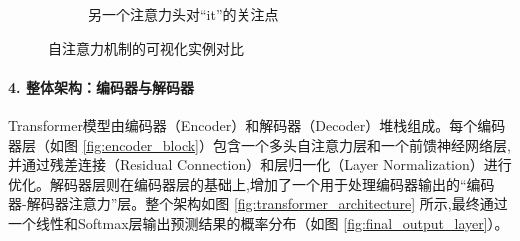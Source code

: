 \begin{figure}[htbp]
\begin{subfigure}[b]{0.48\textwidth}
        \caption{另一个注意力头对“it”的关注点}
        \label{fig:self_attention_it_2}
    \end{subfigure}
    \caption{自注意力机制的可视化实例对比}
    \label{fig:self_attention_example}
\end{figure}

\paragraph{4. 整体架构：编码器与解码器}
Transformer模型由编码器（Encoder）和解码器（Decoder）堆栈组成。每个编码器层（如图 \ref{fig:encoder_block}）包含一个多头自注意力层和一个前馈神经网络层,并通过残差连接（Residual Connection）和层归一化（Layer Normalization）进行优化。解码器层则在编码器层的基础上,增加了一个用于处理编码器输出的“编码器-解码器注意力”层。整个架构如图 \ref{fig:transformer_architecture} 所示,最终通过一个线性和Softmax层输出预测结果的概率分布（如图 \ref{fig:final_output_layer}）。
